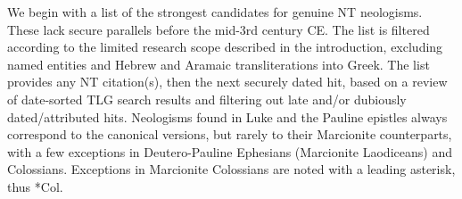 \noindent{}We begin with a list of the strongest candidates for genuine NT neologisms. %
These lack secure parallels before the mid-3rd century CE. %
The list is filtered according to the limited research scope described in the introduction, %
excluding named entities and Hebrew and Aramaic transliterations into Greek. %
The list provides any NT citation(s), %
then the next securely dated hit, based on a review of date-sorted TLG search results %
and filtering out late and/or dubiously dated/attributed hits. %
Neologisms found in Luke and the Pauline epistles %
always correspond to the canonical versions, but rarely to their Marcionite counterparts, %
with a few exceptions in Deutero-Pauline Ephesians (Marcionite Laodiceans) and Colossians. %
Exceptions in Marcionite Colossians are noted with a leading asterisk, thus *Col. \\[5mm] %
%
